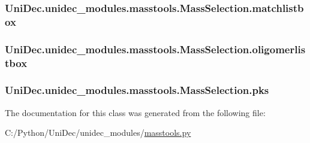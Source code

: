 \subsubsection[{matchlistbox}]{\setlength{\rightskip}{0pt plus 5cm}Uni\+Dec.\+unidec\+\_\+modules.\+masstools.\+Mass\+Selection.\+matchlistbox}\label{class_uni_dec_1_1unidec__modules_1_1masstools_1_1_mass_selection_a38000d3e6e5bba5abfe9b5f0fa8b7c23}
\hypertarget{class_uni_dec_1_1unidec__modules_1_1masstools_1_1_mass_selection_a44857716384d9caae36ada62e6980e53}{}
\subsubsection[{oligomerlistbox}]{\setlength{\rightskip}{0pt plus 5cm}Uni\+Dec.\+unidec\+\_\+modules.\+masstools.\+Mass\+Selection.\+oligomerlistbox}\label{class_uni_dec_1_1unidec__modules_1_1masstools_1_1_mass_selection_a44857716384d9caae36ada62e6980e53}
\hypertarget{class_uni_dec_1_1unidec__modules_1_1masstools_1_1_mass_selection_aac720d56928d377d220e42d8cd2e40e1}{}
\subsubsection[{pks}]{\setlength{\rightskip}{0pt plus 5cm}Uni\+Dec.\+unidec\+\_\+modules.\+masstools.\+Mass\+Selection.\+pks}\label{class_uni_dec_1_1unidec__modules_1_1masstools_1_1_mass_selection_aac720d56928d377d220e42d8cd2e40e1}


The documentation for this class was generated from the following file\+:\begin{DoxyCompactItemize}
\item 
C\+:/\+Python/\+Uni\+Dec/unidec\+\_\+modules/\hyperlink{masstools_8py}{masstools.\+py}\end{DoxyCompactItemize}
